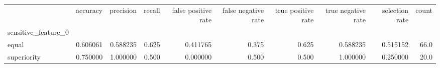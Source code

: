 \begin{tabular}{lrrrrrrrrr}
\toprule
{} &  accuracy &  precision &  recall &  false positive rate &  false negative rate &  true positive rate &  true negative rate &  selection rate &  count \\
sensitive\_feature\_0 &           &            &         &                      &                      &                     &                     &                 &        \\
\midrule
equal               &  0.606061 &   0.588235 &   0.625 &             0.411765 &                0.375 &               0.625 &            0.588235 &        0.515152 &   66.0 \\
superiority         &  0.750000 &   1.000000 &   0.500 &             0.000000 &                0.500 &               0.500 &            1.000000 &        0.250000 &   20.0 \\
\bottomrule
\end{tabular}
